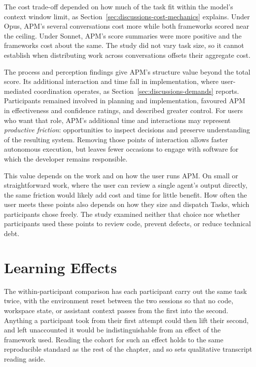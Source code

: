 The cost trade-off depended on how much of the task fit within the model's context window limit, as Section~\ref{sec:discussions-cost-mechanics} explains. Under Opus, APM's several conversations cost more while both frameworks scored near the ceiling. Under Sonnet, APM's score summaries were more positive and the frameworks cost about the same. The study did not vary task size, so it cannot establish when distributing work across conversations offsets their aggregate cost.

The process and perception findings give APM's structure value beyond the total score. Its additional interaction and time fall in implementation, where user-mediated coordination operates, as Section~\ref{sec:discussions-demands} reports. Participants remained involved in planning and implementation, favoured APM in effectiveness and confidence ratings, and described greater control. For users who want that role, APM's additional time and interactions may represent \emph{productive friction}: opportunities to inspect decisions and preserve understanding of the resulting system. Removing those points of interaction allows faster autonomous execution, but leaves fewer occasions to engage with software for which the developer remains responsible.

This value depends on the work and on how the user runs APM. On small or straightforward work, where the user can review a single agent's output directly, the same friction would likely add cost and time for little benefit. How often the user meets these points also depends on how they size and dispatch Tasks, which participants chose freely. The study examined neither that choice nor whether participants used these points to review code, prevent defects, or reduce technical debt.

\section{Learning Effects}
\label{sec:discussions-learning-effects}

The within-participant comparison has each participant carry out the same task twice, with the environment reset between the two sessions so that no code, workspace state, or assistant context passes from the first into the second. Anything a participant took from their first attempt could then lift their second, and left unaccounted it would be indistinguishable from an effect of the framework used. Reading the cohort for such an effect holds to the same reproducible standard as the rest of the chapter, and so sets qualitative transcript reading aside.

